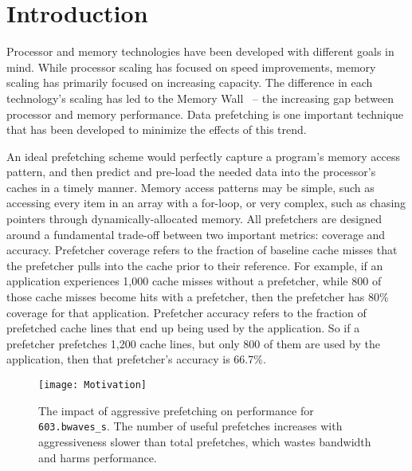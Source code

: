 \section{Introduction}
\label{Introduction}

Processor and memory technologies have been developed with different
goals in mind. While processor scaling has focused on speed
improvements, memory scaling has primarily focused on increasing
capacity. The difference in each technology's scaling has led to the
Memory Wall~\cite{MemWall} -- the increasing gap between processor and
memory performance. Data prefetching is one important technique that
has been developed to minimize the effects of this trend.


An ideal prefetching scheme would perfectly capture a program's memory
access pattern, and then predict and pre-load the needed data into the
processor's caches in a timely manner.  Memory access patterns may be
simple, such as accessing every item in an array with a for-loop, or
very complex, such as chasing pointers through dynamically-allocated
memory.  %
All prefetchers are designed around a fundamental trade-off between
two important metrics: coverage and accuracy. Prefetcher coverage
refers to the fraction of baseline cache misses that the prefetcher
pulls into the cache prior to their reference.  For example, if an
application experiences 1,000 cache misses without a prefetcher, while
800 of those cache misses become hits with a prefetcher, then the
prefetcher has 80\% coverage for that application.  Prefetcher
accuracy refers to the fraction of prefetched cache lines that end up
being used by the application. So if a prefetcher prefetches 1,200
cache lines, but only 800 of them are used by the application, then
that prefetcher's accuracy is 66.7\%.


\begin{figure}[t]
\texttt{[image: Motivation]}
\caption{The impact of aggressive prefetching on performance for {\tt 603.bwaves\_s}. 
The number of useful prefetches increases with aggressiveness
slower than total prefetches, which wastes bandwidth and 
harms performance.}
\label{Fig:Motivation}
\end{figure}

